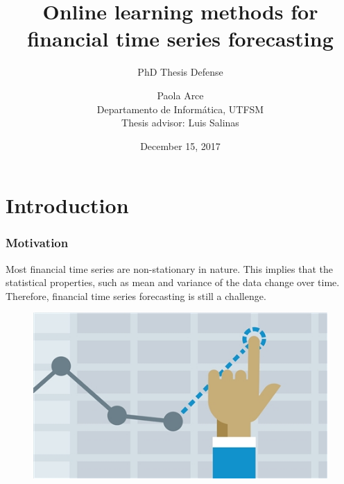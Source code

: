 \documentclass{beamer}
\author{Paola Arce \\ Departamento de Inform\'atica, UTFSM \\ Thesis advisor: Luis Salinas}
\date{December 15, 2017}
\title{Online learning methods for financial time series forecasting}
\subtitle{PhD Thesis Defense}
\begin{document}
\begin{frame}[plain]
\titlepage
\end{frame}



\section{Introduction}

\begin{frame}
\frametitle{Motivation}
Most financial time series are non-stationary in nature. This implies that the statistical properties, such as mean and variance of the data change over time. Therefore, financial time series forecasting is still a challenge.
\begin{figure}
\includegraphics[width=0.4\paperwidth]{img/forecast}
\end{figure}

\end{frame}
\end{document}
